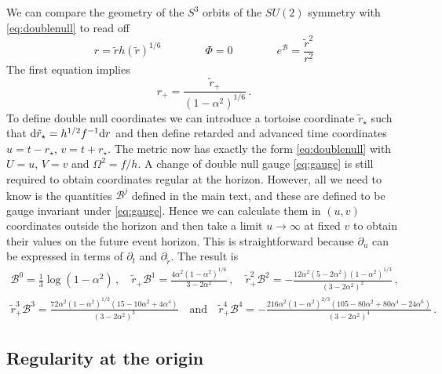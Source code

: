 \documentclass[prl,twocolumn,superscriptaddress,nofootinbib]{revtex4-2}
\begin{document}
We can compare the geometry of the $S^3$ orbits of the $SU(2)$ symmetry with \eqref{eq:doublenull} to read off
\begin{equation}
    r=\tilde{r} h(\tilde{r})^{1/6}\qquad  \qquad \Phi=0 \qquad \qquad e^{\mathcal{B}} = \frac{\tilde{r}^2}{r^2}
\end{equation}
The first equation implies
\begin{equation}
r_+=\frac{{\tilde{r}_+}}{(1-\alpha ^2)^{1/6}}\,.
\end{equation}
To define double null coordinates we can introduce a tortoise coordinate $\tilde{r}_\star$ such that ${\rm d}\tilde{r}_{\star}=h^{1/2}f^{-1}{\rm d}r$ and then define retarded and advanced time coordinates $u=t-r_\star$, $v=t+r_\star$. The metric now has exactly the form \eqref{eq:doublenull} with $U=u$, $V=v$ and $\Omega^2 = f/h$. A change of double null gauge \eqref{eq:gauge} is still required to obtain coordinates regular at the horizon. However, all we need to know is the quantities $\mathcal{B}^j$ defined in the main text, and these are defined to be gauge invariant under \eqref{eq:gauge}. Hence we can calculate them in $(u,v)$ coordinates outside the horizon and then take a limit $u \rightarrow \infty$ at fixed $v$ to obtain their values on the future event horizon. This is straightforward because $\partial_u$ can be expressed in terms of $\partial_t$ and $\partial_{\tilde{r}}$. The result is
\begin{multline}
\mathcal{B}^0=\frac{1}{3} \log \left(1-\alpha ^2\right)\,,\quad \tilde{r}_+\mathcal{B}^1=\frac{4 \alpha ^2 (1-\alpha ^2)^{1/6}}{3-2 \alpha ^2}\,,\quad \tilde{r}^2_+\mathcal{B}^2=-\frac{12 \alpha ^2 \left(5-2 \alpha ^2\right) (1-\alpha ^2)^{1/3}}{\left(3-2 \alpha ^2\right)^2}\,,
\\
\tilde{r}_+^3\mathcal{B}^3=\frac{72 \alpha ^2 (1-\alpha ^2)^{1/2} \left(15-10 \alpha ^2+4 \alpha ^4\right)}{\left(3-2 \alpha ^2\right)^3}\quad\text{and}\quad \tilde{r}_+^4\mathcal{B}^4=-\frac{216 \alpha ^2 \left(1-\alpha ^2\right)^{2/3} \left(105-80 \alpha ^2+80 \alpha ^4-24 \alpha ^6\right)}{\left(3-2 \alpha ^2\right)^4}\,.
\end{multline}

\subsection{Regularity at the origin}
\end{document}
